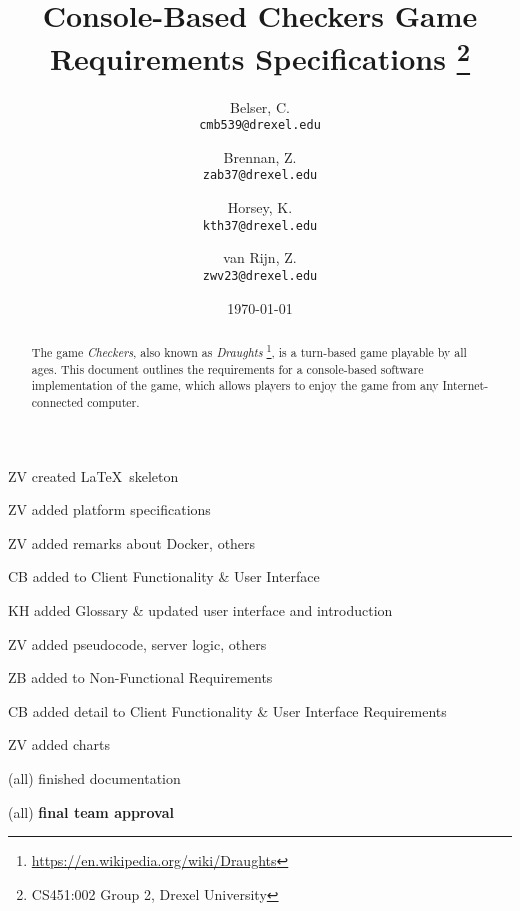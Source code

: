 \documentclass[letterpaper]{article}
\title{
    Console-Based Checkers Game\\
    Requirements Specifications
    \footnote{CS451:002 Group 2, Drexel University}
}
\author{
    Belser, C.\\
    \texttt{cmb539@drexel.edu}
    \and
    Brennan, Z.\\
    \texttt{zab37@drexel.edu}
    \and
    Horsey, K.\\
    \texttt{kth37@drexel.edu}
    \and
    van Rijn, Z.\\
    \texttt{zwv23@drexel.edu}
}
\date{\today}
\begin{document}

\maketitle

\begin{abstract}

The game \emph{Checkers}, also known as \emph{Draughts}
\footnote{\url{https://en.wikipedia.org/wiki/Draughts}}, is a
turn-based game playable by all ages. This document outlines the
requirements for a console-based software implementation of the
game, which allows players to enjoy the game from any Internet-
connected computer.

\end{abstract}


\tableofcontents
\newpage


\begin{versionhistory}
        {\date{}}
        {ZV}
        {created \LaTeX~skeleton}
        {\date{}}
        {ZV}
        {added platform specifications}
        {\date{}}
        {ZV}
        {added remarks about Docker, others}
        {\date{}}
        {CB}
        {added to Client Functionality \& User Interface}
        {\date{}}
        {KH}
        {added Glossary \& updated user interface and 
        introduction}
        {\date{}}
        {ZV}
        {added pseudocode, server logic, others}
        {\date{}}
        {ZB}
        {added to Non-Functional Requirements}
        {\date{}}
        {CB}
        {added detail to Client Functionality \& User 
        Interface Requirements}
        {\date{}}
        {ZV}
        {added charts}
        {\date{}}
        {(all)}
        {finished documentation}
        {\date{}}
        {(all)}
        {\textbf{final team approval}}
\end{versionhistory}
\newpage
\end{document}
